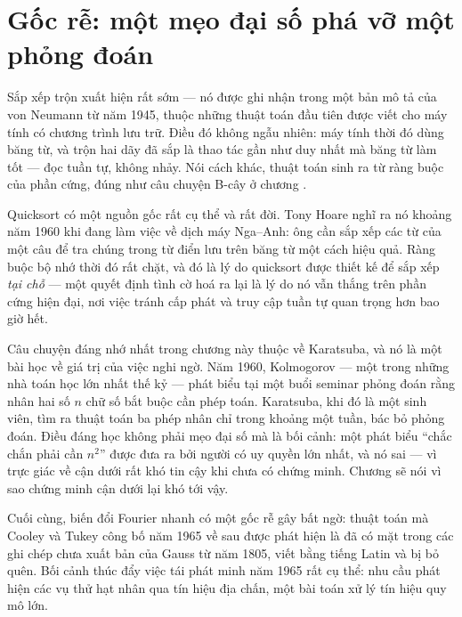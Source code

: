 \documentclass[../../algorithm.tex]{subfiles}
\begin{document}
\section{Gốc rễ: một mẹo đại số phá vỡ một phỏng đoán}

Sắp xếp trộn xuất hiện rất sớm --- nó được ghi nhận trong một bản mô tả của von Neumann từ năm 1945, thuộc những thuật toán đầu tiên được viết cho máy tính có chương trình lưu trữ. Điều đó không ngẫu nhiên: máy tính thời đó dùng băng từ, và trộn hai dãy đã sắp là thao tác gần như duy nhất mà băng từ làm tốt --- đọc tuần tự, không nhảy. Nói cách khác, thuật toán sinh ra từ ràng buộc của phần cứng, đúng như câu chuyện B-cây ở chương .

Quicksort có một nguồn gốc rất cụ thể và rất đời. Tony Hoare nghĩ ra nó khoảng năm 1960 khi đang làm việc về dịch máy Nga--Anh: ông cần sắp xếp các từ của một câu để tra chúng trong từ điển lưu trên băng từ một cách hiệu quả. Ràng buộc bộ nhớ thời đó rất chặt, và đó là lý do quicksort được thiết kế để sắp xếp \emph{tại chỗ} --- một quyết định tình cờ hoá ra lại là lý do nó vẫn thắng trên phần cứng hiện đại, nơi việc tránh cấp phát và truy cập tuần tự quan trọng hơn bao giờ hết.

Câu chuyện đáng nhớ nhất trong chương này thuộc về Karatsuba, và nó là một bài học về giá trị của việc nghi ngờ. Năm 1960, Kolmogorov --- một trong những nhà toán học lớn nhất thế kỷ --- phát biểu tại một buổi seminar phỏng đoán rằng nhân hai số \(n\) chữ số bắt buộc cần  phép toán. Karatsuba, khi đó là một sinh viên, tìm ra thuật toán ba phép nhân chỉ trong khoảng một tuần, bác bỏ phỏng đoán. Điều đáng học không phải mẹo đại số mà là bối cảnh: một phát biểu ``chắc chắn phải cần \(n^2\)'' được đưa ra bởi người có uy quyền lớn nhất, và nó sai --- vì trực giác về cận dưới rất khó tin cậy khi chưa có chứng minh. Chương  sẽ nói vì sao chứng minh cận dưới lại khó tới vậy.

Cuối cùng, biến đổi Fourier nhanh có một gốc rễ gây bất ngờ: thuật toán mà Cooley và Tukey công bố năm 1965\cite{cooley1965} về sau được phát hiện là đã có mặt trong các ghi chép chưa xuất bản của Gauss từ năm 1805, viết bằng tiếng Latin và bị bỏ quên. Bối cảnh thúc đẩy việc tái phát minh năm 1965 rất cụ thể: nhu cầu phát hiện các vụ thử hạt nhân qua tín hiệu địa chấn, một bài toán xử lý tín hiệu quy mô lớn.
\end{document}
